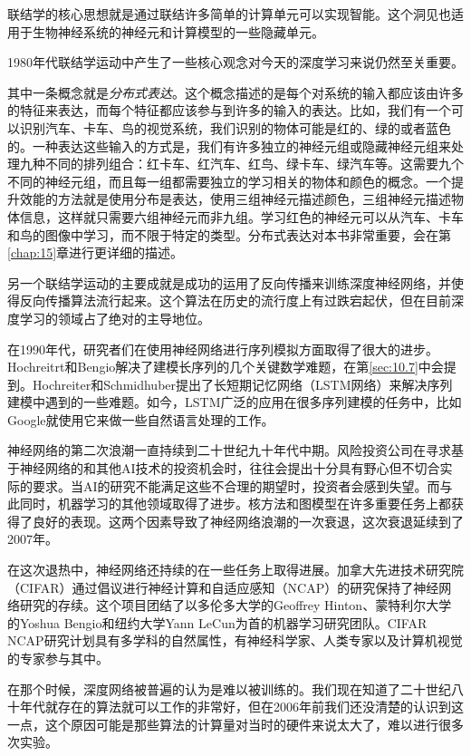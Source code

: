 \documentclass[a4paper,11pt]{book}
\begin{document}
联结学的核心思想就是通过联结许多简单的计算单元可以实现智能。这个洞见也适用于生物神经系统的神经元和计算模型的一些隐藏单元。


1980年代联结学运动中产生了一些核心观念对今天的深度学习来说仍然至关重要。


其中一条概念就是\emph{分布式表达}。这个概念描述的是每个对系统的输入都应该由许多的特征来表达，而每个特征都应该参与到许多的输入的表达。比如，我们有一个可以识别汽车、卡车、鸟的视觉系统，我们识别的物体可能是红的、绿的或者蓝色的。一种表达这些输入的方式是，我们有许多独立的神经元组或隐藏神经元组来处理九种不同的排列组合：红卡车、红汽车、红鸟、绿卡车、绿汽车等。这需要九个不同的神经元组，而且每一组都需要独立的学习相关的物体和颜色的概念。一个提升效能的方法就是使用分布是表达，使用三组神经元描述颜色，三组神经元描述物体信息，这样就只需要六组神经元而非九组。学习红色的神经元可以从汽车、卡车和鸟的图像中学习，而不限于特定的类型。分布式表达对本书非常重要，会在第\ref{chap:15}章进行更详细的描述。


另一个联结学运动的主要成就是成功的运用了反向传播来训练深度神经网络，并使得反向传播算法流行起来。这个算法在历史的流行度上有过跌宕起伏，但在目前深度学习的领域占了绝对的主导地位。

在1990年代，研究者们在使用神经网络进行序列模拟方面取得了很大的进步。Hochreitrt和Bengio解决了建模长序列的几个关键数学难题，在第\ref{sec:10.7}中会提到。Hochreiter和Schmidhuber提出了长短期记忆网络（LSTM网络）来解决序列建模中遇到的一些难题。如今，LSTM广泛的应用在很多序列建模的任务中，比如Google就使用它来做一些自然语言处理的工作。


神经网络的第二次浪潮一直持续到二十世纪九十年代中期。风险投资公司在寻求基于神经网络的和其他AI技术的投资机会时，往往会提出十分具有野心但不切合实际的要求。当AI的研究不能满足这些不合理的期望时，投资者会感到失望。而与此同时，机器学习的其他领域取得了进步。核方法和图模型在许多重要任务上都获得了良好的表现。这两个因素导致了神经网络浪潮的一次衰退，这次衰退延续到了2007年。


在这次退热中，神经网络还持续的在一些任务上取得进展。加拿大先进技术研究院（CIFAR）通过倡议进行神经计算和自适应感知（NCAP）的研究保持了神经网络研究的存续。这个项目团结了以多伦多大学的Geoffrey Hinton、蒙特利尔大学的Yoshua Bengio和纽约大学Yann LeCun为首的机器学习研究团队。CIFAR NCAP研究计划具有多学科的自然属性，有神经科学家、人类专家以及计算机视觉的专家参与其中。


在那个时候，深度网络被普遍的认为是难以被训练的。我们现在知道了二十世纪八十年代就存在的算法就可以工作的非常好，但在2006年前我们还没清楚的认识到这一点，这个原因可能是那些算法的计算量对当时的硬件来说太大了，难以进行很多次实验。
\end{document}
